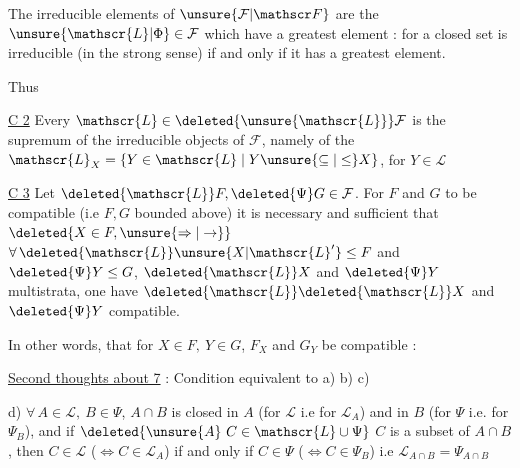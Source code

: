 The irreducible elements of $\unsure{\mathcal F|\mathscr F}$ are the $\unsure{\mathscr{L}|\Phi}\in\mathcal F$ which have  a greatest element : for a closed set is irreducible (in the strong sense) if and only if it has a greatest element.


Thus

\uline{C 2} Every $\mathscr{L}\in\deleted{\unsure{\mathscr{L}}}\mathcal F$ is the supremum of the irreducible objects of $\mathcal F$, namely of the $\mathscr{L}_{X}=\{Y\in\mathscr{L}\mid Y\unsure{\subseteq|\leq}X\}$, for $Y\in\mathscr{L}$

\uline{C 3} Let $\deleted{\mathscr{L}}F,\deleted{\Psi}G\in\mathcal F$. For $F$ and $G$ to be compatible (i.e $F,G$ bounded above) it is necessary and sufficient that $\deleted{X\in F,\unsure{\Rightarrow|\to}}$ $\forall\,\deleted{\mathscr{L}}\unsure{X|{\mathscr{L}}'}\leq F$ and $\deleted{\Psi}Y\leq G$, $\deleted{\mathscr{L}}X$ and $\deleted{\Psi}Y$  multistrata, one have $\deleted{\mathscr{L}}\deleted{\mathscr{L}}X$ and $\deleted{\Psi}Y$ compatible.

In other words, that for $X\in F,\ Y\in G$, $F_X$ and $G_Y$ be compatible :

\uline{Second thoughts about  7} : Condition equivalent to a) b) c)

d)  $\forall\,A\in\mathscr{L},\ B\in\Psi$, $A\cap B$ is closed in $A$ (for $\mathscr{L}$ i.e for $\mathscr{L}_A$) and in $B$ (for $\Psi$ i.e. for $\Psi_B$), and if $\deleted{\unsure{A}\ C\in\mathscr{L}\cup\Psi}$ $C$ is a subset of $A\cap B$, then $C\in\mathscr{L}$ ($\Leftrightarrow C\in\mathscr{L}_A$) if and only if $C\in\Psi$ ($\Leftrightarrow C\in\Psi_B$) i.e $\mathscr{L}_{A\cap B}=\Psi_{A\cap B}$
